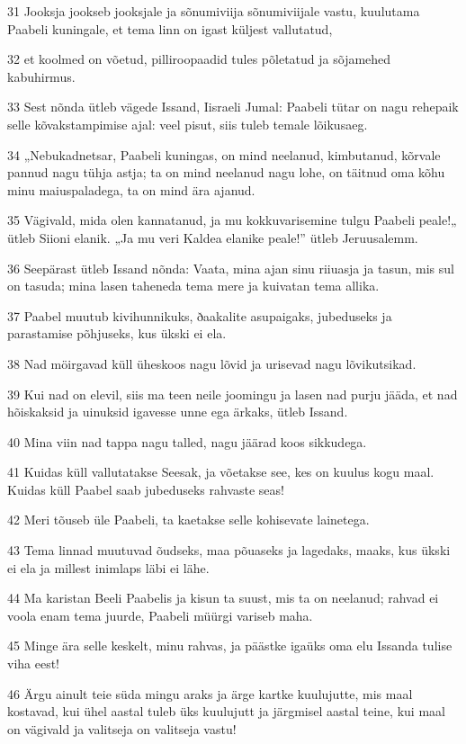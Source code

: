 \par 31 Jooksja jookseb jooksjale ja sõnumiviija sõnumiviijale vastu, kuulutama Paabeli kuningale, et tema linn on igast küljest vallutatud,
\par 32 et koolmed on võetud, pilliroopaadid tules põletatud ja sõjamehed kabuhirmus.
\par 33 Sest nõnda ütleb vägede Issand, Iisraeli Jumal: Paabeli tütar on nagu rehepaik selle kõvakstampimise ajal: veel pisut, siis tuleb temale lõikusaeg.
\par 34 „Nebukadnetsar, Paabeli kuningas, on mind neelanud, kimbutanud, kõrvale pannud nagu tühja astja; ta on mind neelanud nagu lohe, on täitnud oma kõhu minu maiuspaladega, ta on mind ära ajanud.
\par 35 Vägivald, mida olen kannatanud, ja mu kokkuvarisemine tulgu Paabeli peale!„ ütleb Siioni elanik. „Ja mu veri Kaldea elanike peale!” ütleb Jeruusalemm.
\par 36 Seepärast ütleb Issand nõnda: Vaata, mina ajan sinu riiuasja ja tasun, mis sul on tasuda; mina lasen taheneda tema mere ja kuivatan tema allika.
\par 37 Paabel muutub kivihunnikuks, ðaakalite asupaigaks, jubeduseks ja parastamise põhjuseks, kus ükski ei ela.
\par 38 Nad möirgavad küll üheskoos nagu lõvid ja urisevad nagu lõvikutsikad.
\par 39 Kui nad on elevil, siis ma teen neile joomingu ja lasen nad purju jääda, et nad hõiskaksid ja uinuksid igavesse unne ega ärkaks, ütleb Issand.
\par 40 Mina viin nad tappa nagu talled, nagu jäärad koos sikkudega.
\par 41 Kuidas küll vallutatakse Seesak, ja võetakse see, kes on kuulus kogu maal. Kuidas küll Paabel saab jubeduseks rahvaste seas!
\par 42 Meri tõuseb üle Paabeli, ta kaetakse selle kohisevate lainetega.
\par 43 Tema linnad muutuvad õudseks, maa põuaseks ja lagedaks, maaks, kus ükski ei ela ja millest inimlaps läbi ei lähe.
\par 44 Ma karistan Beeli Paabelis ja kisun ta suust, mis ta on neelanud; rahvad ei voola enam tema juurde, Paabeli müürgi variseb maha.
\par 45 Minge ära selle keskelt, minu rahvas, ja päästke igaüks oma elu Issanda tulise viha eest!
\par 46 Ärgu ainult teie süda mingu araks ja ärge kartke kuulujutte, mis maal kostavad, kui ühel aastal tuleb üks kuulujutt ja järgmisel aastal teine, kui maal on vägivald ja valitseja on valitseja vastu!
